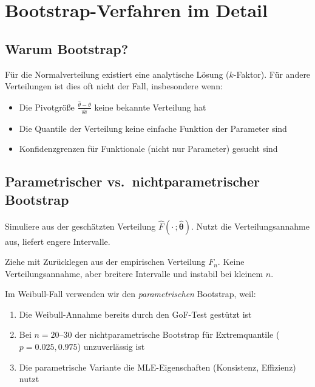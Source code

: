 \documentclass[10pt,a4paper,twocolumn]{article}
\theoremstyle{definition}
\begin{document}
\section{Bootstrap-Verfahren im Detail}
\label{sec:bootstrap}

\subsection{Warum Bootstrap?}

Für die Normalverteilung existiert eine analytische Lösung
($k$-Faktor). Für andere Verteilungen ist dies oft nicht der
Fall, insbesondere wenn:
\begin{itemize}[nosep,leftmargin=*]
    \item Die Pivotgröße $\frac{\hat{\theta} - \theta}{\hat{\text{se}}}$
          keine bekannte Verteilung hat
    \item Die Quantile der Verteilung keine einfache Funktion der
          Parameter sind
    \item Konfidenzgrenzen für Funktionale (nicht nur Parameter)
          gesucht sind
\end{itemize}

\subsection{Parametrischer vs.\ nichtparametrischer Bootstrap}

\begin{description}[nosep,leftmargin=*,font=\bfseries]
    \item[Parametrisch:] Simuliere aus der geschätzten Verteilung
        $\hat{F}(\cdot\,; \hat{\boldsymbol{\theta}})$.
        Nutzt die Verteilungsannahme aus, liefert engere Intervalle.
    \item[Nichtparametrisch:] Ziehe mit Zurücklegen aus der
        empirischen Verteilung $F_n$.
        Keine Verteilungsannahme, aber breitere Intervalle
        und instabil bei kleinem $n$.
\end{description}

Im Weibull-Fall verwenden wir den \emph{parametrischen} Bootstrap,
weil:
\begin{enumerate}[nosep,leftmargin=*]
    \item Die Weibull-Annahme bereits durch den GoF-Test gestützt ist
    \item Bei $n = 20$--$30$ der nichtparametrische Bootstrap
          für Extremquantile ($p = 0.025, 0.975$) unzuverlässig ist
    \item Die parametrische Variante die MLE-Eigenschaften
          (Konsistenz, Effizienz) nutzt
\end{enumerate}
\end{document}
